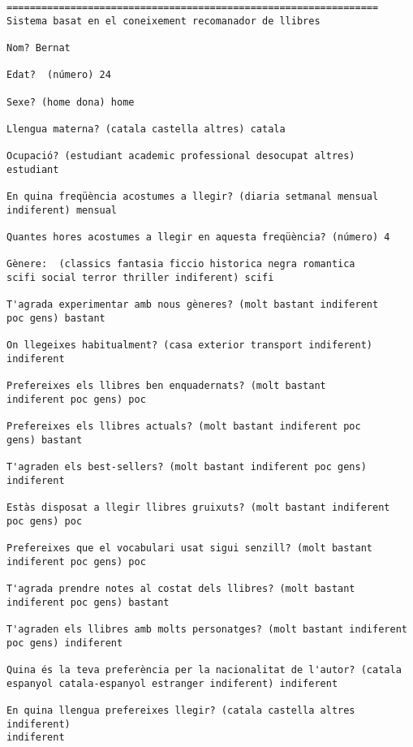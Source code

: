 \begin{verbatim}
================================================================
Sistema basat en el coneixement recomanador de llibres

Nom? Bernat

Edat?  (número) 24

Sexe? (home dona) home

Llengua materna? (catala castella altres) catala

Ocupació? (estudiant academic professional desocupat altres)
estudiant

En quina freqüència acostumes a llegir? (diaria setmanal mensual
indiferent) mensual

Quantes hores acostumes a llegir en aquesta freqüència? (número) 4

Gènere:  (classics fantasia ficcio historica negra romantica
scifi social terror thriller indiferent) scifi

T'agrada experimentar amb nous gèneres? (molt bastant indiferent
poc gens) bastant

On llegeixes habitualment? (casa exterior transport indiferent)
indiferent

Prefereixes els llibres ben enquadernats? (molt bastant
indiferent poc gens) poc

Prefereixes els llibres actuals? (molt bastant indiferent poc
gens) bastant   

T'agraden els best-sellers? (molt bastant indiferent poc gens)
indiferent

Estàs disposat a llegir llibres gruixuts? (molt bastant indiferent
poc gens) poc

Prefereixes que el vocabulari usat sigui senzill? (molt bastant
indiferent poc gens) poc

T'agrada prendre notes al costat dels llibres? (molt bastant
indiferent poc gens) bastant

T'agraden els llibres amb molts personatges? (molt bastant indiferent
poc gens) indiferent

Quina és la teva preferència per la nacionalitat de l'autor? (catala
espanyol catala-espanyol estranger indiferent) indiferent

En quina llengua prefereixes llegir? (catala castella altres indiferent)
indiferent


\end{verbatim}
